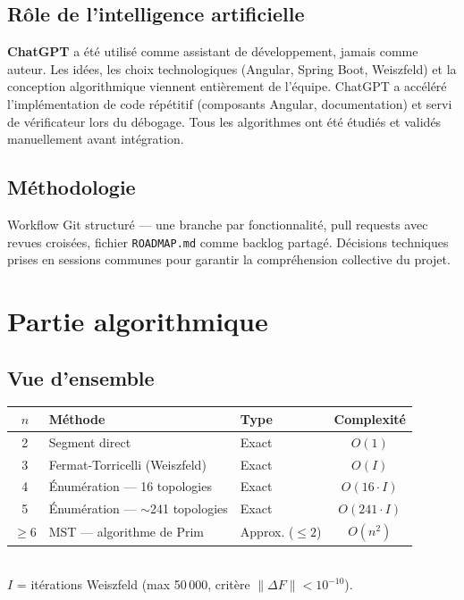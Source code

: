 \documentclass[11pt, a4paper]{article}
\begin{document}
\subsection{Rôle de l'intelligence artificielle}

\textbf{ChatGPT} a été utilisé comme assistant de développement, jamais comme auteur.
Les idées, les choix technologiques (Angular, Spring Boot, Weiszfeld) et la conception
algorithmique viennent entièrement de l'équipe. ChatGPT a accéléré l'implémentation de
code répétitif (composants Angular, documentation) et servi de vérificateur lors du
débogage. Tous les algorithmes ont été étudiés et validés manuellement avant intégration.

\subsection{Méthodologie}

Workflow Git structuré — une branche par fonctionnalité, pull requests avec revues croisées,
fichier \texttt{ROADMAP.md} comme backlog partagé. Décisions techniques prises en sessions
communes pour garantir la compréhension collective du projet.

\section{Partie algorithmique}

\subsection{Vue d'ensemble}

\begin{center}
\small\setlength{\tabcolsep}{5pt}
\begin{tabular}{@{}cllc@{}}
\toprule
\rowcolor{bleuClair}
$n$ & \textbf{Méthode} & \textbf{Type} & \textbf{Complexité} \\
\midrule
2 & Segment direct & Exact & $O(1)$ \\
3 & Fermat-Torricelli (Weiszfeld) & Exact & $O(I)$ \\
4 & Énumération — 16 topologies & Exact & $O(16 \cdot I)$ \\
5 & Énumération — $\sim$241 topologies & Exact & $O(241 \cdot I)$ \\
$\geq 6$ & MST — algorithme de Prim & Approx. ($\leq 2$) & $O(n^2)$ \\
\bottomrule
\end{tabular}\\[3pt]
\scriptsize $I$ = itérations Weiszfeld (max 50\,000, critère $\|\Delta F\| < 10^{-10}$).
\end{center}
\end{document}
